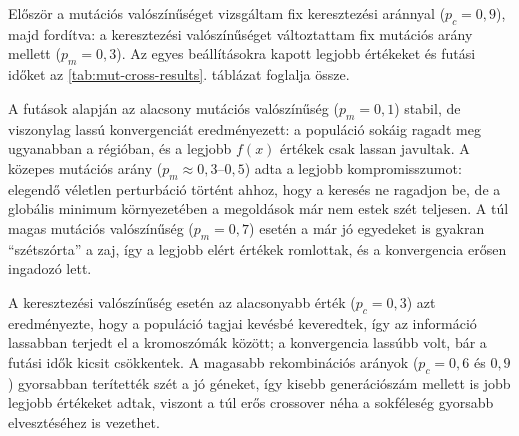 \documentclass[a4paper,12pt]{article}
\begin{document}
Először a mutációs valószínűséget vizsgáltam fix keresztezési aránnyal
($p_c = 0{,}9$), majd fordítva: a keresztezési valószínűséget változtattam
fix mutációs arány mellett ($p_m = 0{,}3$). Az egyes beállításokra kapott
legjobb értékeket és futási időket az
\ref{tab:mut-cross-results}. táblázat foglalja össze.

\begin{table}[H]
  \centering
  \caption{A mutációs és keresztezési valószínűségek hatása a Rastrigin-függvényen (2D).}
  \label{tab:mut-cross-results}
\end{table}

A futások alapján az alacsony mutációs valószínűség ($p_m = 0{,}1$)
stabil, de viszonylag lassú konvergenciát eredményezett: a populáció
sokáig ragadt meg ugyanabban a régióban, és a legjobb $f(x)$ értékek
csak lassan javultak. A közepes mutációs arány
($p_m \approx 0{,}3$--$0{,}5$) adta a legjobb kompromisszumot:
elegendő véletlen perturbáció történt ahhoz, hogy a keresés ne ragadjon
be, de a globális minimum környezetében a megoldások már nem estek
szét teljesen. A túl magas mutációs valószínűség ($p_m = 0{,}7$)
esetén a már jó egyedeket is gyakran ``szétszórta'' a zaj, így a
legjobb elért értékek romlottak, és a konvergencia erősen ingadozó
lett.

A keresztezési valószínűség esetén az alacsonyabb érték
($p_c = 0{,}3$) azt eredményezte, hogy a populáció tagjai kevésbé
keveredtek, így az információ lassabban terjedt el a kromoszómák
között; a konvergencia lassúbb volt, bár a futási idők kicsit
csökkentek. A magasabb rekombinációs arányok ($p_c = 0{,}6$ és
$0{,}9$) gyorsabban terítették szét a jó géneket, így kisebb
generációszám mellett is jobb legjobb értékeket adtak, viszont
a túl erős crossover néha a sokféleség gyorsabb elvesztéséhez is
vezethet.
\end{document}
